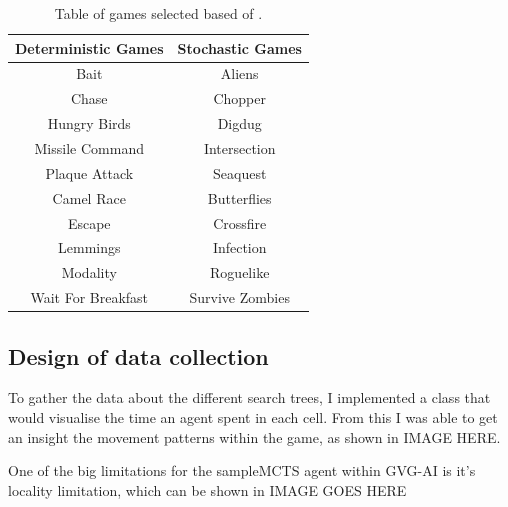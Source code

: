 \documentclass[journal]{IEEEtran}
\begin{document}
	
	\begin{table}[h!]
	\centering
	\begin{tabular} { |c||c|} 
		 \hline
		 \bf{Deterministic Games} & \bf{Stochastic Games} \\
		 \hline
		 Bait & Aliens  \\
 		Chase  & Chopper   \\
		Hungry Birds  & Digdug   \\
		Missile Command  & Intersection   \\
		Plaque Attack  & Seaquest   \\
		Camel Race  & Butterflies   \\
		Escape  & Crossfire   \\
		Lemmings  & Infection   \\
		Modality  & Roguelike   \\
		Wait For Breakfast  & Survive Zombies   \\
		\hline
	\end{tabular}
	\caption{ Table of games selected based of \cite{guerrero2017beyond, gaina2017population}.}
	\label{GamesTable}
	\end{table}
	
	


	\subsection{Design of data collection}
	
	To gather the data about the different search trees, I implemented a class that would visualise the time an agent spent in each cell. 
	From this I was able to get an insight the movement patterns within the game, as shown in IMAGE HERE.
	
	One of the big limitations for the sampleMCTS agent within GVG-AI is it's locality limitation, which can be shown in IMAGE GOES HERE
	
	
\end{document}
